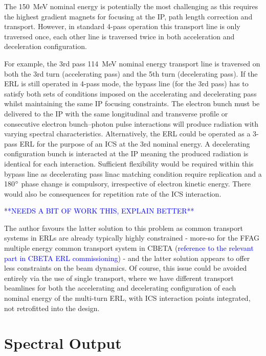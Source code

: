 \documentclass[../main.tex]{subfiles}
\begin{document}
The 150~\si{\mega\electronvolt} nominal energy is potentially the most challenging as this requires the highest gradient magnets for focusing at the IP, path length correction and transport. However, in standard 4-pass operation this transport line is only traversed once, each other line is traversed twice in both acceleration and deceleration configuration.

For example, the 3rd pass 114~\si{\mega\electronvolt} nominal energy transport line is traversed on both the 3rd turn (accelerating pass) and the 5th turn (decelerating pass). If the ERL is still operated in 4-pass mode, the bypass line (for the 3rd pass) has to satisfy both sets of conditions imposed on the accelerating and decelerating pass whilst maintaining the same IP focusing constraints. The electron bunch must be delivered to the IP with the same longitudinal and transverse profile or consecutive electron bunch--photon pulse interactions will produce radiation with varying spectral characteristics. Alternatively, the ERL could be operated as a 3-pass ERL for the purpose of an ICS at the 3rd nominal energy. A decelerating configuration bunch is interacted at the IP meaning the produced radiation is identical for each interaction. Sufficient flexibility would be required within this bypass line as decelerating pass linac matching condition require replication and a 180$\degree$ phase change  is compulsory, irrespective of electron kinetic energy. There would also be consequences for repetition rate of the ICS interaction.   

\textcolor{blue}{**NEEDS A BIT OF WORK THIS, EXPLAIN BETTER**}

The author favours the latter solution to this problem as common transport systems in ERLs are already typically highly constrained - more-so for the FFAG multiple energy common transport system in CBETA  (\textcolor{blue}{reference to the relevant part in CBETA ERL commissioning}) - and the latter solution appears to offer less constraints on the beam dynamics. Of course, this issue could be avoided entirely via the use of single transport, where we have different transport beamlines for both the accelerating and decelerating configuration of each nominal energy of the multi-turn ERL, with ICS interaction points integrated, not retrofitted into the design.     

\section{Spectral Output}
\end{document}
